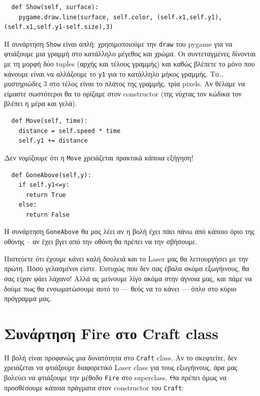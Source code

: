\begin{verbatim}
  def Show(self, surface):
    pygame.draw.line(surface, self.color, (self.x1,self.y1),(self.x1,self.y1-self.size),3)
\end{verbatim}

Η συνάρτηση {\tt Show} είναι απλή: χρησιμοποιούμε την {\tt draw} του pygame για να φτιάξουμε μια γραμμή στο κατάλληλο μέγεθος και χρώμα. Οι συντεταγμένες δίνονται με τη μορφή δύο tuples (αρχής και τέλους γραμμής) και καθώς βλέπετε το μόνο που κάνουμε είναι να αλλάζουμε το {\tt y1} για το κατάλληλο μήκος γραμμής. Το\ldots{} μυστηριώδες 3 στο τέλος είναι το πλάτος της γραμμής, τρία pixels. Αν θέλαμε να είμαστε σωστότεροι θα το ορίζαμε στον constructor (της νύχτας τον κώδικα τον βλέπει η μέρα και γελά).

\begin{verbatim}
  def Move(self, time):
    distance = self.speed * time
    self.y1 += distance
\end{verbatim}

Δεν νομίζουμε ότι η {\tt Move} χρειάζεται πρακτικά κάποια εξήγηση!

\begin{verbatim}
  def GoneAbove(self,y):
    if self.y1<=y:
      return True
    else:
      return False
\end{verbatim}

Η συνάρτηση {\tt GoneAbove} θα μας λέει αν η βολή έχει πάει πάνω από κάποιο όριο της οθόνης -- αν έχει βγει από την οθόνη θα πρέπει να την σβήσουμε.

Πιστεύετε ότι έχουμε κάνει καλή δουλειά και το Laser μας θα λειτουργήσει με την πρώτη. Πόσο γελασμένοι είστε. Ευτυχώς που δεν σας έβαλα ακόμα εξωγήινους, θα σας είχαν φάει λάχανο! Αλλά ας μείνουμε λίγο ακόμα στην άγνοια μας, και πάμε να δούμε πως θα ενσωματώσουμε αυτό το --- θεός να το κάνει --- όπλο στο κύριο πρόγραμμα μας.
%
\section{Συνάρτηση Fire στο Craft class}
%
Η βολή είναι προφανώς μια δυνατότητα στο {\tt Craft} class.  Αν το σκεφτείτε, δεν χρειάζεται να φτιάξουμε διαφορετικό Laser class για τους εξωγήινους, άρα μας βολεύει να φτιάξουμε την μέθοδο {\tt Fire} στο superclass.  Θα πρέπει όμως να προσθέσουμε κάποια πράγματα στον constructor του {\tt Craft}:

